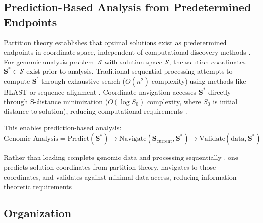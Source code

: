 \documentclass[11pt,a4paper]{article}
\theoremstyle{remark}
\newcommand{\Scoord}{\mathbf{S}}
\begin{document}
\subsection{Prediction-Based Analysis from Predetermined Endpoints}

Partition theory establishes that optimal solutions exist as predetermined endpoints in coordinate space, independent of computational discovery methods \citep{poincare1890probleme, Sachikonye2025_Poincare}. For genomic analysis problem $\mathcal{A}$ with solution space $\mathcal{S}$, the solution coordinates $\Scoord^* \in \mathcal{S}$ exist prior to analysis. Traditional sequential processing attempts to compute $\Scoord^*$ through exhaustive search ($O(n^2)$ complexity) using methods like BLAST or sequence alignment \citep{altschul1990basic, needleman1970general, smith1981identification}. Coordinate navigation accesses $\Scoord^*$ directly through S-distance minimization ($O(\log S_0)$ complexity, where $S_0$ is initial distance to solution), reducing computational requirements \citep{landauer1961irreversibility}.

This enables prediction-based analysis:
\begin{equation}
\text{Genomic Analysis} = \text{Predict}(\Scoord^*) \to \text{Navigate}(\Scoord_{\text{current}}, \Scoord^*) \to \text{Validate}(\text{data}, \Scoord^*)
\end{equation}

Rather than loading complete genomic data and processing sequentially \citep{altschul1990basic, gusfield1997algorithms}, one predicts solution coordinates from partition theory, navigates to those coordinates, and validates against minimal data access, reducing information-theoretic requirements \citep{shannon1948mathematical, landauer1961irreversibility}.

\subsection{Organization}
\end{document}
